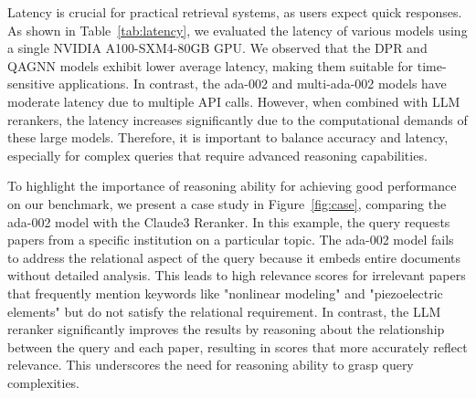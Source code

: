  Latency is crucial for practical retrieval systems, as users expect quick responses. As shown in Table~\ref{tab:latency}, we evaluated the latency of various models using a single NVIDIA A100-SXM4-80GB GPU. We observed that the DPR and QAGNN models exhibit lower average latency, making them suitable for time-sensitive applications. In contrast, the ada-002 and multi-ada-002 models have moderate latency due to multiple API calls. However, when combined with LLM rerankers, the latency increases significantly due to the computational demands of these large models. Therefore, it is important to balance accuracy and latency, especially for complex queries that require advanced reasoning capabilities. 


To highlight the importance of reasoning ability for achieving good performance on our benchmark, we present a case study in Figure~\ref{fig:case}, comparing the ada-002 model with the Claude3 Reranker. In this example, the query requests papers from a specific institution on a particular topic. The ada-002 model fails to address the relational aspect of the query because it embeds entire documents without detailed analysis. This leads to high relevance scores for irrelevant papers that frequently mention keywords like "nonlinear modeling" and "piezoelectric elements" but do not satisfy the relational requirement. In contrast, the LLM reranker significantly improves the results by reasoning about the relationship between the query and each paper, resulting in scores that more accurately reflect relevance. This underscores the need for reasoning ability to grasp query complexities. 

